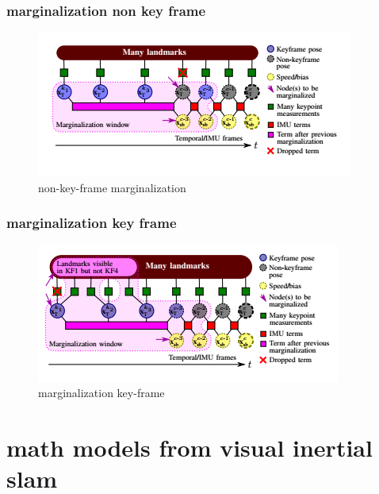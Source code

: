 \documentclass[10pt,a4paper]{article}
\begin{document}
\subsubsection{marginalization non key frame}
\begin{figure}[h!]
	\centering
	\includegraphics[width=0.7\linewidth]{images/okvis-marginalization-nonkeyframe}
	\caption{non-key-frame marginalization}
	\label{fig:okvis-marginalization-nonkeyframe}
\end{figure}

\subsubsection{marginalization key frame}
\begin{figure}[h!]
	\centering
	\includegraphics[width=0.7\linewidth]{images/okvis-marginalization-keyframe}
	\caption{marginalization key-frame}
	\label{fig:okvis-marginalization-keyframe}
\end{figure}


\section{math models from visual inertial slam}
\end{document}
